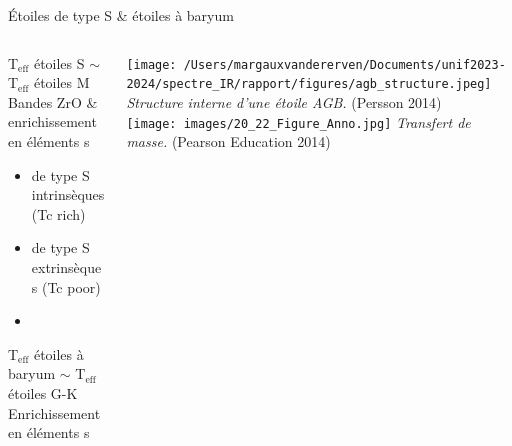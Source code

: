 \documentclass[10pt]{beamer}
\begin{document}
\begin{frame}[fragile]{Étoiles de type S \& étoiles à baryum}

    \begin{columns}
            \begin{column}{0.6\textwidth}

                    T$_{\text{eff}}$ étoiles S $\sim$ T$_{\text{eff}}$ étoiles M\\

                    Bandes ZrO \& enrichissement en éléments s
    

    					\begin{itemize}
    						\item de type S intrinsèques (Tc rich) 
    						\item de type S extrinsèques (Tc poor)
    						\item[] 
    					\end{itemize} 
                        \vspace{0.5cm}

                        T$_{\text{eff}}$ étoiles à baryum $\sim$ T$_{\text{eff}}$ étoiles G-K\\
                        Enrichissement en éléments s \\
            \end{column}
            \begin{column}{0.4\textwidth}
                \centering
                \texttt{[image: /Users/margauxvandererven/Documents/unif2023-2024/spectre\_IR/rapport/figures/agb\_structure.jpeg]}
    			\footnotesize{\textit{Structure interne d'une étoile AGB.} (Persson 2014)} \\
                \vspace{0.5cm}
                \texttt{[image: images/20\_22\_Figure\_Anno.jpg]}
                \footnotesize{\textit{Transfert de masse.} (Pearson Education 2014)}
            \end{column}
    \end{columns}
\end{frame}
\end{document}

